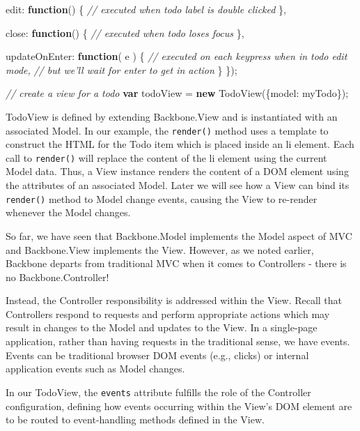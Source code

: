 \documentclass[9pt]{book}
\newenvironment{Shaded}{}{}
\newcommand{\KeywordTok}[1]{\textcolor[rgb]{0.00,0.44,0.13}{\textbf{{#1}}}}
\newcommand{\DataTypeTok}[1]{\textcolor[rgb]{0.56,0.13,0.00}{{#1}}}
\newcommand{\CommentTok}[1]{\textcolor[rgb]{0.38,0.63,0.69}{\textit{{#1}}}}
\newcommand{\FunctionTok}[1]{\textcolor[rgb]{0.02,0.16,0.49}{{#1}}}
\newcommand{\NormalTok}[1]{{#1}}
\begin{document}
\begin{Shaded}
\begin{Highlighting}[]
  \DataTypeTok{edit}\NormalTok{: }\KeywordTok{function}\NormalTok{() \{}
    \CommentTok{// executed when todo label is double clicked}
  \NormalTok{\},}

  \DataTypeTok{close}\NormalTok{: }\KeywordTok{function}\NormalTok{() \{}
    \CommentTok{// executed when todo loses focus}
  \NormalTok{\},}

  \DataTypeTok{updateOnEnter}\NormalTok{: }\KeywordTok{function}\NormalTok{( e ) \{}
    \CommentTok{// executed on each keypress when in todo edit mode,}
    \CommentTok{// but we'll wait for enter to get in action}
  \NormalTok{\}}
\NormalTok{\});}

\CommentTok{// create a view for a todo}
\KeywordTok{var} \NormalTok{todoView = }\KeywordTok{new} \FunctionTok{TodoView}\NormalTok{(\{}\DataTypeTok{model}\NormalTok{: myTodo\});}
\end{Highlighting}
\end{Shaded}

TodoView is defined by extending Backbone.View and is instantiated with
an associated Model. In our example, the \texttt{render()} method uses a
template to construct the HTML for the Todo item which is placed inside
an li element. Each call to \texttt{render()} will replace the content
of the li element using the current Model data. Thus, a View instance
renders the content of a DOM element using the attributes of an
associated Model. Later we will see how a View can bind its
\texttt{render()} method to Model change events, causing the View to
re-render whenever the Model changes.

So far, we have seen that Backbone.Model implements the Model aspect of
MVC and Backbone.View implements the View. However, as we noted earlier,
Backbone departs from traditional MVC when it comes to Controllers -
there is no Backbone.Controller!

Instead, the Controller responsibility is addressed within the View.
Recall that Controllers respond to requests and perform appropriate
actions which may result in changes to the Model and updates to the
View. In a single-page application, rather than having requests in the
traditional sense, we have events. Events can be traditional browser DOM
events (e.g., clicks) or internal application events such as Model
changes.

In our TodoView, the \texttt{events} attribute fulfills the role of the
Controller configuration, defining how events occurring within the
View's DOM element are to be routed to event-handling methods defined in
the View.
\end{document}
